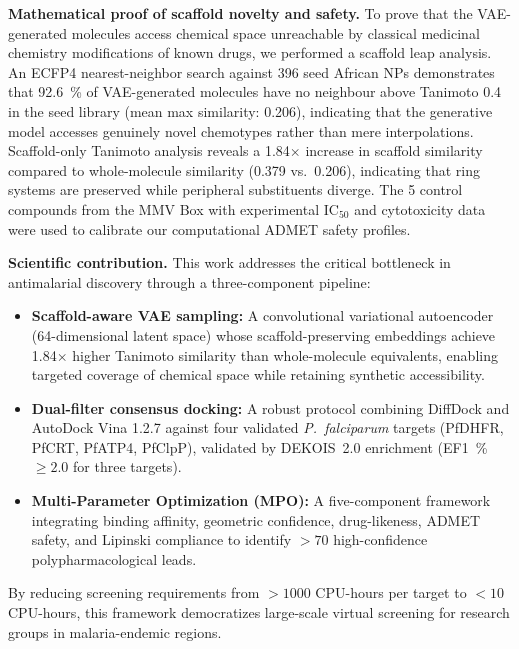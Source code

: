 \documentclass[11pt,letterpaper]{article}
\begin{document}
\textbf{Mathematical proof of scaffold novelty and safety.} To prove that the VAE-generated molecules access chemical space unreachable by classical medicinal chemistry modifications of known drugs, we performed a scaffold leap analysis. An ECFP4 nearest-neighbor search against \num{396} seed African NPs demonstrates that \qty{92.6}{\percent} of VAE-generated molecules have no neighbour above Tanimoto \num{0.4} in the seed library (mean max similarity: \num{0.206}), indicating that the generative model accesses genuinely novel chemotypes rather than mere interpolations. Scaffold-only Tanimoto analysis reveals a \num{1.84}$\times$ increase in scaffold similarity compared to whole-molecule similarity (\num{0.379} vs.\ \num{0.206}), indicating that ring systems are preserved while peripheral substituents diverge. The \num{5} control compounds from the MMV Box with experimental IC$_{50}$ and cytotoxicity data were used to calibrate our computational ADMET safety profiles.

\textbf{Scientific contribution.} This work addresses the critical bottleneck in antimalarial discovery through a three-component pipeline:
\begin{itemize}
    \item \textbf{Scaffold-aware VAE sampling:} A convolutional variational autoencoder (\num{64}-dimensional latent space) whose scaffold-preserving embeddings achieve 1.84$\times$ higher Tanimoto similarity than whole-molecule equivalents, enabling targeted coverage of chemical space while retaining synthetic accessibility.
    \item \textbf{Dual-filter consensus docking:} A robust protocol combining DiffDock and AutoDock Vina 1.2.7 against four validated \textit{P.\ falciparum} targets (PfDHFR, PfCRT, PfATP4, PfClpP), validated by DEKOIS~2.0 enrichment (EF\qty{1}{\percent} $\geq \num{2.0}$ for three targets).
    \item \textbf{Multi-Parameter Optimization (MPO):} A five-component framework integrating binding affinity, geometric confidence, drug-likeness, ADMET safety, and Lipinski compliance to identify $>\num{70}$ high-confidence polypharmacological leads.
\end{itemize}
By reducing screening requirements from $>\num{1000}$ CPU-hours per target to $<\num{10}$ CPU-hours, this framework democratizes large-scale virtual screening for research groups in malaria-endemic regions.
\end{document}

